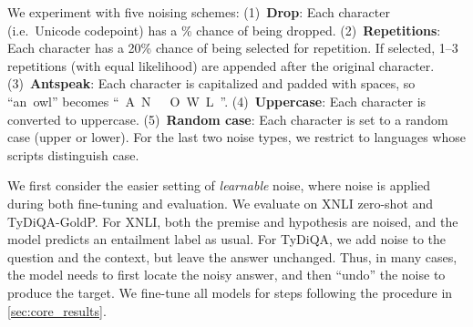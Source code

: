 \documentclass[11pt,a4paper]{article}
\begin{document}
We experiment with five noising schemes: (1)~\textbf{Drop}: Each character (i.e.~Unicode codepoint) has a \% chance of being dropped. (2)~\textbf{Repetitions}: Each character has a 20\% chance of being selected for repetition. If selected, 1--3 repetitions (with equal likelihood) are appended after the original character. (3)~\textbf{Antspeak}: Each character is capitalized and padded with spaces, so ``an~owl'' becomes ``~A~N~~~O~W~L~''. (4)~\textbf{Uppercase}: Each character is converted to uppercase. (5)~\textbf{Random case}: Each character is set to a random case (upper or lower). For the last two noise types, we restrict to languages whose scripts distinguish case.

We first consider the easier setting of \emph{learnable} noise, where noise is applied during both fine-tuning and evaluation. We evaluate on XNLI zero-shot and TyDiQA-GoldP\@. For XNLI, both the premise and hypothesis are noised, and the model predicts an entailment label as usual. For TyDiQA, we add noise to the question and the context, but leave the answer unchanged. Thus, in many cases, the model needs to first locate the noisy answer, and then ``undo'' the noise to produce the target. We fine-tune all models for  steps following the procedure in \cref{sec:core_results}.
\end{document}
